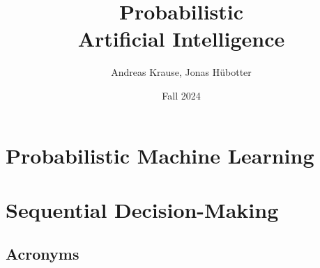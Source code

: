 \documentclass[justified,nobib,twoside]{tufte-book}
\title{Probabilistic \\ Artificial Intelligence}
\author{Andreas Krause, Jonas Hübotter}
\date{Fall 2024}
\begin{document}
  \frontmatter{}

  \maketitle

  

  

  \tableofcontents

  \mainmatter\setcounter{page}{1}

  

  \part{Probabilistic Machine Learning}\label{part1}
  
  
  
  
  
  
  

  \part{Sequential Decision-Making}\label{part2}
  
  
  
  
  
  
  

  \appendix

  
  

  \begin{fullwidth}
    \backmatter
    {\small
      \renewcommand{\leftmark}{\textsc{\bibname}}
      \renewcommand{\rightmark}{\textsc{\bibname}}
      
      \cleardoublepage
    }

    

    \chapter*{Acronyms}
    \begin{flushleft}
      \begin{small}
        \begin{multicols}{2}
          \printacronyms[heading=none]
        \end{multicols}
      \end{small}
    \end{flushleft}

    \printindex

  \end{fullwidth}
\end{document}
